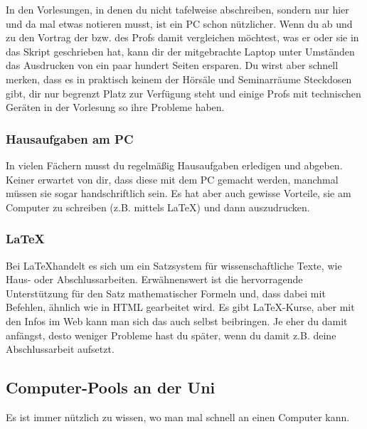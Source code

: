 			In den Vorlesungen, in denen du nicht tafelweise abschreiben, sondern nur hier und da mal etwas notieren musst, ist ein PC schon nützlicher. Wenn du ab und zu den Vortrag der bzw. des Profs damit vergleichen möchtest, was er oder sie in das Skript geschrieben hat, kann dir der mitgebrachte Laptop unter Umständen das Ausdrucken von ein paar hundert Seiten ersparen. Du wirst aber schnell merken, dass es in praktisch keinem der Hörsäle und Seminarräume Steckdosen gibt, dir nur begrenzt Platz zur Verfügung steht und einige Profs mit technischen Geräten in der Vorlesung so ihre Probleme haben.

		\subsubsection{Hausaufgaben am PC}
			In vielen Fächern musst du regelmäßig Hausaufgaben erledigen und abgeben. Keiner erwartet von dir, dass diese mit dem PC gemacht werden, manchmal müssen sie sogar handschriftlich sein. Es hat aber auch gewisse Vorteile, sie am Computer zu schreiben (z.B. mittels \LaTeX) und dann auszudrucken.

		\subsubsection{\LaTeX}
			Bei \LaTeX handelt es sich um ein Satzsystem für wissenschaftliche Texte, wie Haus- oder Abschlussarbeiten. Erwähnenswert ist die hervorragende Unterstützung für den Satz mathematischer Formeln und, dass dabei mit Befehlen, ähnlich wie in HTML gearbeitet wird. Es gibt \LaTeX-Kurse,
			 aber mit den Infos im Web kann man sich das auch selbst beibringen. Je eher du damit anfängst, desto weniger Probleme hast du später, wenn du damit z.B. deine Abschlussarbeit aufsetzt.

		\subsection{Computer-Pools an der Uni}
			Es ist immer nützlich zu wissen, wo man mal schnell an einen Computer kann.

